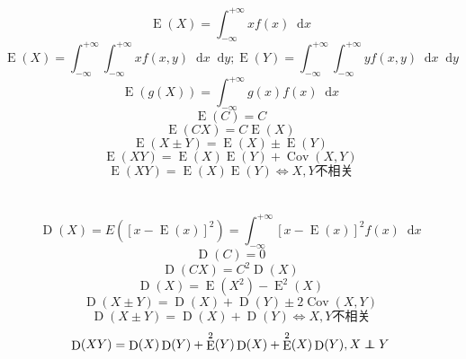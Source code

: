 \documentclass[]{article}
\newcommand*{\dif}{\mathop{}\!\mathrm{d}}
\numberwithin{equation}{section}
\DeclareMathOperator{\E}{E}
\DeclareMathOperator{\D}{D}
\DeclareMathOperator{\Cov}{Cov}
\newcommand\independent{\protect\mathpalette{\protect\independenT}{\perp}}
\def\independenT#1#2{\mathrel{\rlap{$#1#2$}\mkern2mu{#1#2}}}
\begin{document}
\section{}
\begin{equation}
    \E(X)=\int_{-\infty}^{+\infty}xf(x)\dif x
\end{equation}
\begin{equation}
    \E(X)=\int_{-\infty}^{+\infty}\int_{-\infty}^{+\infty}xf(x,y)\dif x\dif y;\E(Y)=\int_{-\infty}^{+\infty}\int_{-\infty}^{+\infty}yf(x,y)\dif x\dif y
\end{equation}
\begin{equation}
    \E(g(X))=\int_{-\infty}^{+\infty}g(x)f(x)\dif x
\end{equation}
\begin{equation}
    \E(C)=C
\end{equation}
\begin{equation}
    \E(CX)=C\E(X)
\end{equation}
\begin{equation}
    \E(X\pm Y)=\E(X)\pm \E(Y)
\end{equation}
\begin{equation}
    \E(XY)=\E(X)\E(Y)+\Cov(X,Y)
\end{equation}
\begin{equation}
    \E(XY)=\E(X)\E(Y)\iff X,Y\text{不相关}
\end{equation}

\section{}
\begin{equation}
    \D(X)=E([x-\E(x)]^2)=\int_{-\infty}^{+\infty}[x-\E(x)]^2f(x)\dif x
\end{equation}
\begin{equation}
    \D(C)=0
\end{equation}
\begin{equation}
    \D(CX)=C^2\D(X)
\end{equation}
\begin{equation}
    \D(X)=\E(X^2)-\E^2(X)
\end{equation}
\begin{equation}
    \D(X\pm Y)=\D(X)+\D(Y)\pm2\Cov(X,Y)
\end{equation}
\begin{equation}
    \D(X\pm Y)=\D(X)+\D(Y)\iff X,Y\text{不相关}
\end{equation}
\begin{equation}
    \D(XY)=\D(X)\D(Y)+\E^2(Y)\D(X)+\E^2(X)\D(Y),X\independent Y
\end{equation}
\end{document}
